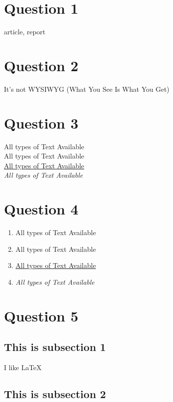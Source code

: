 \documentclass{article}
\begin{document}
\tableofcontents

\section{Question 1}

article, report

\section{Question 2}

It's not WYSIWYG (What You See Is What You Get)

\section{Question 3}

\tiny All types of Text Available \\
\large All types of Text Available \\
\normalsize
\underline{All types of Text Available} \\
\textit{All types of Text Available}

\section{Question 4}

\begin{enumerate}
    \item \tiny All types of Text Available 
    \large
    \item All types of Text Available 
    \normalsize
    \item \underline{All types of Text Available} 
    \item \textit{All types of Text Available}
\end{enumerate}

\section{Question 5}

\subsection{This is subsection 1}

I like \LaTeX

\subsection{This is subsection 2}
\end{document}
